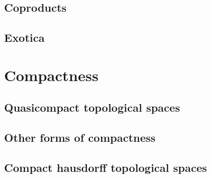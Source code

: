 \documentclass[a4paper,nobib,nols]{tufte-book}
\begin{document}
\section{Coproducts}%
\label{sec:coproducts}

\section{Exotica}%
\label{sec:exotica}

\chapter{Compactness}%
\label{cha:compactness}

\section{Quasicompact topological spaces}%
\label{sec:quasicompact_topological_spaces}

\section{Other forms of compactness}%
\label{sec:other_forms_of_compactness}

\section{Compact hausdorff topological spaces}%
\label{sec:compact_hausdorff_topological_spaces}

\end{document}
